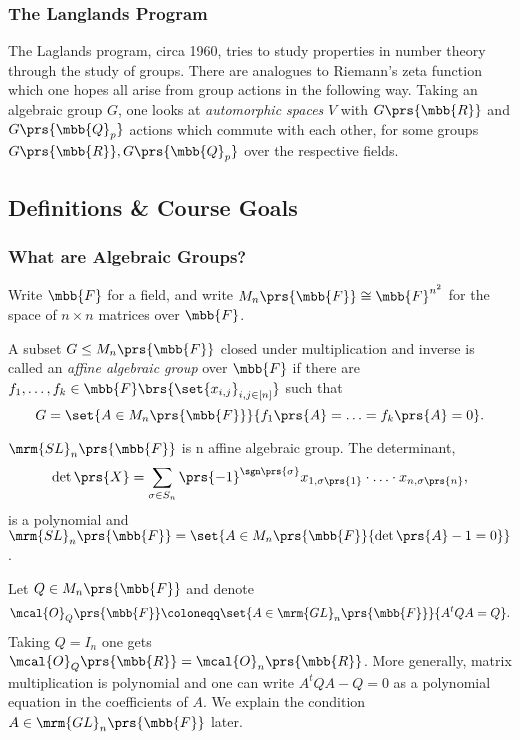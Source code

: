 \documentclass[10pt,a4paper,twoside,openany,hidelinks]{book}
\begin{document}
\subsubsection{The Langlands Program}

The Laglands program, circa 1960, tries to study properties in number theory through the study of groups. There are analogues to Riemann's zeta function which one hopes all arise from group actions in the following way.
Taking an algebraic group $G$, one looks at \emph{automorphic spaces} $V$ with $G\prs{\mbb{R}}$ and $G\prs{\mbb{Q}_p}$ actions which commute with each other, for some groups $G\prs{\mbb{R}}, G\prs{\mbb{Q}_p}$ over the respective fields.

\subsection{Definitions \& Course Goals}

\subsubsection{What are Algebraic Groups?}

Write $\mbb{F}$ for a field, and write $M_n\prs{\mbb{F}} \cong \mbb{F}^{n^2}$ for the space of $n \times n$ matrices over $\mbb{F}$.

\begin{definition}
A subset $G \leq M_n\prs{\mbb{F}}$ closed under multiplication and inverse is called an \emph{affine algebraic group} over $\mbb{F}$ if there are $f_1, \ldots, f_k \in \mbb{F}\brs{\set{x_{i,j}}_{i,j \in [n]}}$ such that
\[G = \set{A \in M_n\prs{\mbb{F}}}{f_1\prs{A} = \ldots = f_k\prs{A} = 0} \text{.}\]
\end{definition}

\begin{example}
$\mrm{SL}_n\prs{\mbb{F}}$ is n affine algebraic group. The determinant,
\[\det\prs{X} = \sum_{\sigma \in S_n} \prs{-1}^{\sgn\prs{\sigma}} x_{1,\sigma\prs{1}} \cdot \ldots \cdot x_{n,\sigma\prs{n}} \text{,}\]
is a polynomial and $\mrm{SL}_n\prs{\mbb{F}} = \set{A \in M_n\prs{\mbb{F}}{\det\prs{A} - 1 = 0}}$.
\end{example}

\begin{example}
Let $Q \in M_n\prs{\mbb{F}}$ and denote
\[\mcal{O}_{Q}\prs{\mbb{F}} \coloneqq \set{A \in \mrm{GL}_n\prs{\mbb{F}}}{A^t Q A = Q} \text{.}\]
Taking $Q = I_n$ one gets $\mcal{O}_Q\prs{\mbb{R}} = \mcal{O}_n\prs{\mbb{R}}$. More generally, matrix multiplication is polynomial and one can write $A^t Q A - Q = 0$ as a polynomial equation in the coefficients of $A$. We explain the condition $A \in \mrm{GL}_n\prs{\mbb{F}}$ later.
\end{example}
\end{document}
